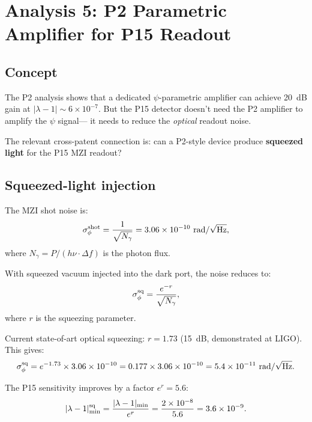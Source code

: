 \documentclass[11pt]{article}
\newcommand{\ee}[1]{\times 10^{#1}}
\newcommand{\lam}{\lambda}
\begin{document}
\section{Analysis 5: P2 Parametric Amplifier for P15 Readout}
\label{sec:p2-amplifier}

\subsection{Concept}

The P2 analysis shows that a dedicated $\psi$-parametric amplifier
can achieve 20~dB gain at $|\lam-1| \sim 6\ee{-7}$. But the P15
detector doesn't need the P2 amplifier to amplify the $\psi$ signal---
it needs to reduce the \emph{optical} readout noise.

The relevant cross-patent connection is: can a P2-style device
produce \textbf{squeezed light} for the P15 MZI readout?

\subsection{Squeezed-light injection}

The MZI shot noise is:
\begin{equation}
\sigma_\phi^{\rm shot} = \frac{1}{\sqrt{N_\gamma}} = 3.06\ee{-10}
\text{ rad}/\sqrt{\text{Hz}},
\end{equation}
where $N_\gamma = P/(h\nu \cdot \Delta f)$ is the photon flux.

With squeezed vacuum injected into the dark port, the noise reduces to:
\begin{equation}
\sigma_\phi^{\rm sq} = \frac{e^{-r}}{\sqrt{N_\gamma}},
\end{equation}
where $r$ is the squeezing parameter.

Current state-of-art optical squeezing: $r = 1.73$ (15~dB,
demonstrated at LIGO). This gives:
\begin{equation}
\sigma_\phi^{\rm sq} = e^{-1.73} \times 3.06\ee{-10}
= 0.177 \times 3.06\ee{-10} = 5.4\ee{-11}\text{ rad}/\sqrt{\text{Hz}}.
\end{equation}

The P15 sensitivity improves by a factor $e^r = 5.6$:
\begin{equation}
|\lam-1|_{\rm min}^{\rm sq} = \frac{|\lam-1|_{\rm min}}{e^r}
= \frac{2\ee{-8}}{5.6} = 3.6\ee{-9}.
\end{equation}
\end{document}
